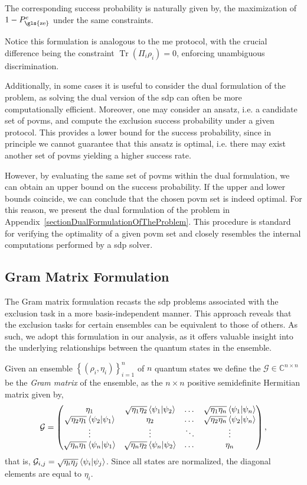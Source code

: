 \documentclass[12pt,letterpaper]{article}
\DeclareMathOperator{\tr}{Tr}
\begin{document}
The corresponding success probability is naturally given by, the maximization of $1-P_{\text{\gls{ze}}}^e$ under the same constraints.

Notice this formulation is analogous to the \gls{me} protocol, with the crucial difference being the constraint $\tr(\Pi_i \rho_i) = 0$, enforcing unambiguous discrimination.

Additionally, in some cases it is useful to consider the dual formulation of the problem, as solving the dual version of the \gls{sdp} can often be more computationally efficient. Moreover, one may consider an ansatz, i.e. a candidate set of \gls{povm}s, and compute the exclusion success probability under a given protocol. This provides a lower bound for the success probability, since in principle we cannot guarantee that this ansatz is optimal, i.e. there may exist another set of \gls{povm}s yielding a higher success rate.

However, by evaluating the same set of \gls{povm}s within the dual formulation, we can obtain an upper bound on the success probability. If the upper and lower bounds coincide, we can conclude that the chosen \gls{povm} set is indeed optimal. For this reason, we present the dual formulation of the problem in Appendix~\ref{sectionDualFormulationOfTheProblem}. This procedure is standard for verifying the optimality of a given \gls{povm} set and closely resembles the internal computations performed by a \gls{sdp} solver.

\subsection{Gram Matrix Formulation}\label{sectionGramMatrixFormulation}
The Gram matrix formulation recasts the \gls{sdp} problems associated with the exclusion task in a more basis-independent manner. This approach reveals that the exclusion tasks for certain ensembles can be equivalent to those of others. As such, we adopt this formulation in our analysis, as it offers valuable insight into the underlying relationships between the quantum states in the ensemble.

Given an ensemble $\left\{(\rho_i, \eta_i)\right\}_{i=1}^n$ of $n$ quantum states we define the $\mathcal{G} \in \mathbb{C}^{n \times n}$ be the \emph{Gram matrix} of the ensemble, as the $n \times n$ positive semidefinite Hermitian matrix given by,
\begin{equation*}
	\mathcal{G} =
	\begin{pmatrix}
		\eta_1 & \sqrt{\eta_1\eta_2}\braket{\psi_1|\psi_2} & \dots & \sqrt{\eta_1\eta_n}\braket{\psi_1|\psi_n} \\
		\sqrt{\eta_2\eta_1}\braket{\psi_2|\psi_1} & \eta_2 & \dots & \sqrt{\eta_2\eta_n}\braket{\psi_2|\psi_n} \\
		\vdots & \vdots & \ddots & \vdots \\
		\sqrt{\eta_n\eta_1}\braket{\psi_n|\psi_1} & \sqrt{\eta_n\eta_2}\braket{\psi_n|\psi_2} & \dots & \eta_n
	\end{pmatrix},
\end{equation*}
that is, $\mathcal{G}_{i,j} = \sqrt{\eta_i\eta_j}\braket{\psi_i|\psi_j}$. Since all states are normalized, the diagonal elements are equal to $\eta_i$.
\end{document}
